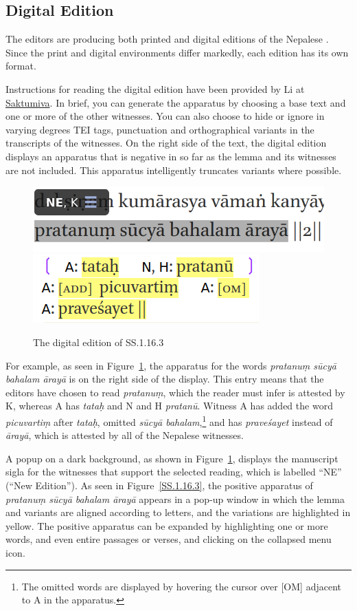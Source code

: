 \subsection{Digital Edition}
The editors are producing both printed and digital editions of the Nepalese 
\SS. Since the print and digital environments differ markedly, each edition has 
its own format. 

Instructions for reading the digital edition have been provided by  Li at 
\href{https://saktumiva.org/wiki/users}{Saktumiva}. In brief, you can 
generate the apparatus by choosing a base text and one or more of the other 
witnesses. You can also choose to hide or ignore in varying degrees TEI 
tags, punctuation and orthographical variants in the transcripts of the witnesses. 
On the right side of the text, the digital edition displays an apparatus that is 
negative in so far as the lemma and its witnesses are not included. This apparatus 
intelligently truncates variants where possible. 

\begin{figure}[t]
    \centering
    \includegraphics[draft=false,width=.5\textwidth]{media/SS.1.16.3c}
    \quad
    \includegraphics[draft=false,width=.35\textwidth]{media/SS.1.16.3d}
    \caption{The digital edition of SS.1.16.3}
    \label{SS.1.16}
\end{figure}
For example, as seen in Figure~\ref{SS.1.16}, the apparatus for the words
\emph{pratanuṃ sūcyā bahalam ārayā} is on the right side of the display.
This entry means that the editors have chosen to read \emph{pratanuṃ}, which
the reader must infer is attested by K, whereas A has \emph{tataḥ} and N and
H \emph{pratanū}. Witness A has added the word \emph{picuvartiṃ} after
\emph{tataḥ}, omitted \emph{sūcyā bahalam},\footnote{The omitted words are
    displayed by hovering the cursor over [OM] adjacent to A in the apparatus.}
    and has \emph{praveśayet} instead of \emph{ārayā}, which is attested by all
    of the Nepalese witnesses.

A popup on a dark background, as shown in Figure~\ref{SS.1.16}, displays the
manuscript sigla for the witnesses that support the selected reading, which is
labelled “NE” (“New Edition”). As seen in Figure~\ref{SS.1.16.3}, the positive
apparatus of \emph{pratanuṃ sūcyā bahalam ārayā} appears in a pop-up window in
which the lemma and variants are aligned according to letters, and the variations
are highlighted in yellow. The positive apparatus can be expanded by highlighting
one or more words, and even entire passages or verses, and clicking on the
collapsed menu icon.

